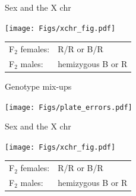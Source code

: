 \documentclass[12pt]{article}
\newcommand{\headsize}{\fontsize{35}{35} \selectfont}
\newcommand{\smallersize}{\fontsize{20}{25} \selectfont}
\begin{document}
\newpage

\headsize \color{myyellow}
\hfill \begin{minipage}{5.75in}
\centering
Sex and the X chr
\end{minipage}

\vfill

\begin{minipage}[t]{5.5in}
\vspace*{0mm}

\texttt{[image: Figs/xchr\_fig.pdf]}
\end{minipage}
\hfill
\begin{minipage}[t]{4.8in}
\vspace*{35mm}

\smallersize
\color{mywhite}



\begin{tabular}{ll}
F$_{\text{2}}$ females: & {\color{myblue} R/R or B/R} \\[18pt]
F$_{\text{2}}$ males: & {\color{myblue} hemizygous B or R}
\end{tabular}

\end{minipage}

\newpage


\headsize \color{myyellow}
\hfill \begin{minipage}{5.75in}
\centering
Genotype mix-ups
\end{minipage}

\vfill

\centerline{\texttt{[image: Figs/plate\_errors.pdf]}}

\newpage

\headsize \color{myyellow}
\hfill \begin{minipage}{5.75in}
\centering
Sex and the X chr
\end{minipage}

\vfill

\begin{minipage}[t]{5.5in}
\vspace*{0mm}

\texttt{[image: Figs/xchr\_fig.pdf]}
\end{minipage}
\hfill
\begin{minipage}[t]{4.8in}
\vspace*{35mm}

\smallersize
\color{mywhite}



\begin{tabular}{ll}
F$_{\text{2}}$ females: & {\color{myblue} R/R or B/R} \\[18pt]
F$_{\text{2}}$ males: & {\color{myblue} hemizygous B or R}
\end{tabular}

\end{minipage}
\end{document}
